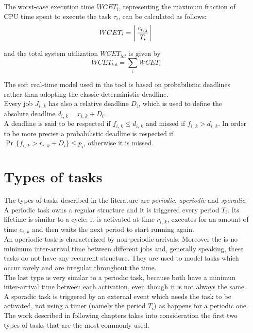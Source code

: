 The worst-case execution time \( WCET_{i} \), representing the maximum fraction of CPU time spent to execute the task \( \tau_{i} \), can be calculated as follows:
\begin{equation*}
  WCET_{i} = \ceil[\bigg]{\frac{c_{i,\,j}}{T_{i}}}
\end{equation*}

and the total system utilization \( WCET_{tot} \) is given by
\begin{equation*}
  WCET_{tot} = \displaystyle\sum_{i} WCET_{i}
\end{equation*}

The soft real-time model used in the tool is based on probabilistic deadlines rather than adopting the classic deterministic deadline.\\
Every job \( J_{i,\,k} \) has also a relative deadline \( D_{i} \), which is used to define the absolute deadline \( d_{i,\,k} = r_{i,\,k} + D_{i} \). \\
A deadline is said to be respected if \( f_{i,\,k} \leq d_{i,\,k} \) and missed if \( f_{i,\,k} > d_{i,\,k} \). In order to be more precise a probabilistic deadline is respected if \( \Pr\,\{f_{i,\,k} > r_{i,\,k} + D_{i} \} \leq p_{i} \), otherwise it is missed.

\section{Types of tasks}
The types of tasks described in the literature are \emph{periodic}, \emph{aperiodic} and \emph{sporadic}.\\
A periodic task owns a regular structure and it is triggered every period \( T_{i} \). Its lifetime is similar to a cycle: it is activated at time \( r_{i,\,k} \), executes for an amount of time \( c_{i,\,k} \) and then waits the next period to start running again.\\
An aperiodic task is characterized by non-periodic arrivals. Moreover the is no minimum inter-arrival time between different jobs and, generally speaking, these tasks do not have any recurrent structure. They are used to model tasks which occur rarely and are irregular throughout the time.\\
The last type is very similar to a periodic task, because both have a minimun inter-arrival time between each activation, even though it is not always the same. A sporadic task is triggered by an external event which needs the task to be activated, not using a timer (namely the period \( T_{i} \)) as happens for a periodic one.\\
The work described in following chapters takes into consideration the first two types of tasks that are the most commonly used.

